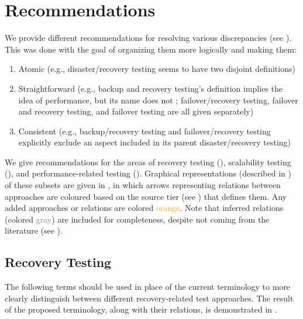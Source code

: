 \section{Recommendations}
\label{recs}

We provide different recommendations for resolving various
discrepancies (see ). This was done with the goal of
organizing them more logically and making them:
\begin{enumerate}
    \item Atomic (e.g., disaster/recovery testing seems to have two
          disjoint definitions)
    \item Straightforward (e.g., backup and recovery testing's definition
          implies the idea of performance, but its name does not
          \ifnotpaper; failover/recovery testing, failover and recovery
          testing, and failover testing are all given separately\fi)
    \item Consistent (e.g., backup/recovery testing and failover/recovery
          testing explicitly exclude an aspect included in its parent
          disaster/recovery testing)
\end{enumerate}
We give recommendations for the areas of recovery testing (),
scalability testing (), and performance-related testing
(). Graphical representations (described in
) of these subsets are given in
\recFigs{}, in which arrows representing relations between approaches are
coloured based on the source tier (see ) that defines them.
Any added approaches or relations are colored \textcolor{orange}{orange}.
\ifnotpaper Note that
    inferred relations (colored \textcolor{gray}{gray}) are included for
    completeness, despite not coming from the
    literature (see ).
\fi

\subsection{Recovery Testing}
\label{rec-test-rec}
The following terms should be used in place of the current terminology to
more clearly distinguish between different recovery-related test approaches.
The result of the proposed terminology, along with their relations, is
demonstrated in .

\recoveryGraphs{}

